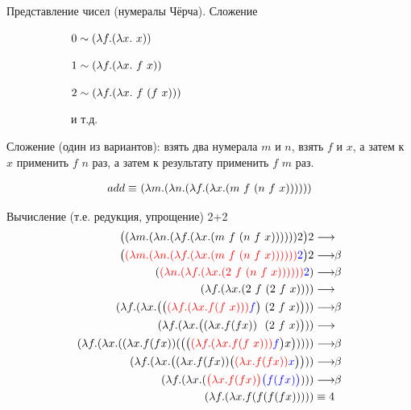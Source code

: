 \begin{frame}{Представление чисел (нумералы Чёрча). Сложение}
\begin{figure}[t]
    \begin{subfigure}[t]{0.35\textwidth}
$ 0 \sim (\lambda f . (\lambda x . \ x))$

$ 1 \sim (\lambda f . (\lambda x . \ f\ x))$

$ 2 \sim (\lambda f . (\lambda x . \ f\ (f\ x)))$

  и т.д.
    \end{subfigure}
    \begin{subfigure}[t]{0.55\textwidth}
    \begin{minipage}{\textwidth}
    \numeralIsFor
    \end{minipage}
    \end{subfigure}
\end{figure}

  \vspace{2em}

  Сложение (один из вариантов): взять два нумерала $m$ и $n$, взять $f$ и $x$, а затем к $x$ применить $f$ $n$ раз, а затем к результату применить $f$ $m$ раз.

{\Large \begin{align*}
add \equiv &\ (\lambda m . (\lambda n . (\lambda f . (\lambda x . (m\ f\  (n\ f\  x))))))\\
\end{align*}}
\end{frame}


\begin{frame}{Вычисление (т.е. редукция, упрощение) 2+2}
\def\betaarr{\longrightarrow\!\!\beta}
\def\numTWO{\ensuremath{\lam{f}{\lam{x}{f(f\ x)}}}}
\vspace{-2em}
{\Large
  \begin{align}
    \App{\lam{m}{\lam{n}{\lam{f}{\lam{x}{\app{m\ f\ }{\app{n\ f\ }{x}} }}}}}{2} 2 & \longrightarrow \\
    \Redex{\lam{m}{\lam{n}{\lam{f}{\lam{x}{\app{m\ f\ }{\app{n\ f\ }{x}} }}}}}{2} 2 & \betaarr \\
    \redex{\lam{n}{\lam{f}{\lam{x}{\app{2\ f\ }{\app{n\ f\ }{x}}){}}}}} {2} & \betaarr \\
    \lam{f}{\lam{x}{ \app{2\ f\ }{\app{2\ f\ }{x}}}}   & \longrightarrow \\
    \lam{f}{\lam{x}{ \App{\Redex{\numTWO}{f}\ }{\app{2\ f\ }{x}}}} & \betaarr \\
    \lam{f}{\lam{x}{ \App{\lam{x}{f (f x)} \ \ }{\app{2\ f\ }{x}}}} & \longrightarrow \\
    \lam{f}{\lam{x}{ \app{\lam{x}{f (f x)}} {\app{\App{\Redex{\numTWO}{f}}{x}}}}} & \betaarr \\
    \lam{f}{\lam{x}{ \App{\lam{x}{f (f x)}  } {\Redex{\lam{x}{f (f x)} }{x}}}} & \betaarr \\
    \lam{f}{\lam{x}{ \redex{\Lam{x}{f (f x)}}{\App{f}{\app{f}{x}}}}} & \betaarr \\
    \lam{f}{\lam{x}{ f (f (f (f x)))}} & \equiv 4
  \end{align}}
\end{frame}

